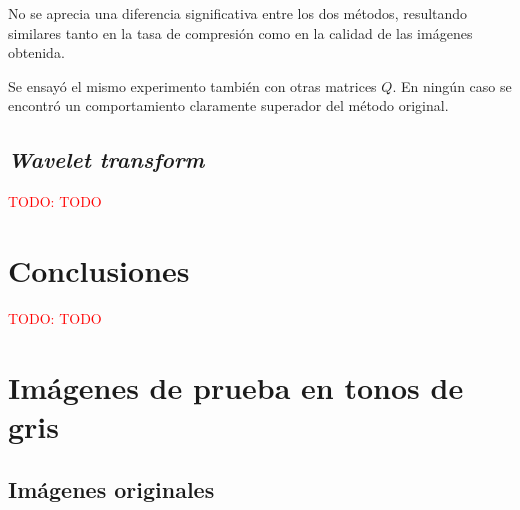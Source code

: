 \documentclass{article}
\newcommand{\TODO}[1]{\textcolor{red}{TODO: #1}}
\begin{document}
No se aprecia una diferencia significativa entre los dos métodos,
resultando similares tanto en la tasa de compresión como en la calidad
de las imágenes obtenida.

Se ensayó el mismo experimento también con otras matrices $Q$.
En ningún caso se encontró un comportamiento claramente superador del método
original.

\subsection{{\em Wavelet transform}}

  \TODO{TODO}

\section{Conclusiones}

\TODO{TODO}

\newpage
\appendix
\section{Imágenes de prueba en tonos de gris}

\subsection{Imágenes originales}
\end{document}
